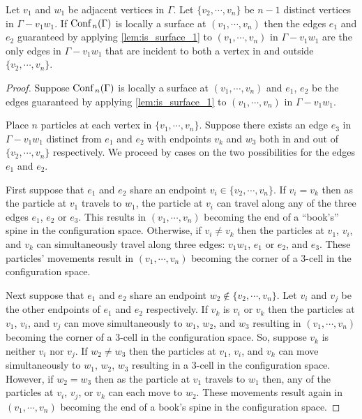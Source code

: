 \begin{lem}
    \label{lem:is_surface_2}
    Let \(v_1\) and \(w_1\) be adjacent vertices in \(\Gamma\).
    Let \(\{v_2, \cdots, v_n\}\) be \(n-1\) distinct vertices in \(\Gamma - v_1 w_1\).
    If \(\text{Conf}\,_n(\Gamma)\) is locally a surface at \((v_1, \cdots, v_n)\) then the edges \(e_1\) and \(e_2\)
    guaranteed by applying \ref{lem:is_surface_1} to \((v_1,\cdots, v_n)\) in \(\Gamma - v_1 w_1\) 
    are the only edges in \(\Gamma - v_1 w_1\) that are incident to both a vertex in and outside \(\{v_2, \cdots, v_n\}\).
\end{lem}
\begin{proof}
    Suppose \(\text{Conf}\,_n(\Gamma)\) is locally a surface at \((v_1, \cdots, v_n)\) and \(e_1\), \(e_2\) be the edges guaranteed
    by applying \ref{lem:is_surface_1} to \((v_1,\cdots, v_n)\) in \(\Gamma - v_1 w_1\).

    Place \(n\) particles at each vertex in \(\{v_1, \cdots, v_n\}\).
    Suppose there exists an edge \(e_3\) in \(\Gamma - v_1 w_1\) distinct from
    \(e_1\) and \(e_2\) with endpoints \(v_k\) and \(w_3\) both in and out of
    \(\{v_2,\cdots, v_n\}\) respectively. 
    We proceed by cases on the two possibilities for the edges \(e_1\) and \(e_2\).

    First suppose that \(e_1\) and \(e_2\) share an endpoint \(v_i \in \{v_2,\cdots,v_n\}\).
    If \(v_i = v_k\) then as the particle at \(v_1\) travels to \(w_1\), the particle
    at \(v_i\) can travel along any of the three edges \(e_1\), \(e_2\) or \(e_3\).
    This results in \((v_1,\cdots,v_n)\) becoming the end of a ``book's'' spine in the configuration space.
    Otherwise, if \(v_i \neq v_k\) then the particles at \(v_1\), \(v_i\), and \(v_k\) can simultaneously travel along 
    three edges: \(v_1 w_1\), \(e_1\) or \(e_2\), and \(e_3\).
    These particles' movements result in \((v_1, \cdots, v_n)\) becoming the corner of a \(3\)-cell in the configuration space.

    Next suppose that \(e_1\) and \(e_2\) share an endpoint \(w_2 \not \in \{v_2,\cdots, v_n\}\).
    Let \(v_i\) and \(v_j\) be the other endpoints of \(e_1\) and \(e_2\) respectively.
    If \(v_k\) is \(v_i\) or \(v_k\) then the particles at \(v_1\), \(v_i\), and \(v_j\) can move simultaneously to
    \(w_1\), \(w_2\), and \(w_3\) resulting in \((v_1, \cdots, v_n)\) becoming the corner of a \(3\)-cell in the configuration space.
    So, suppose \(v_k\) is neither \(v_i\) nor \(v_j\).
    If \(w_2 \neq w_3\) then the particles at \(v_1\), \(v_i\), and \(v_k\) can move simultaneously to \(w_1\), \(w_2\), \(w_3\)
    resulting in a \(3\)-cell in the configuration space.
    However, if \(w_2 = w_3\) then as the particle at \(v_1\) travels to \(w_1\) then, any of the particles at
    \(v_i\), \(v_j\), or \(v_k\) can each move to \(w_2\). These movements result again in \((v_1, \cdots, v_n)\) becoming the 
    end of a book's spine in the configuration space.
\end{proof}

